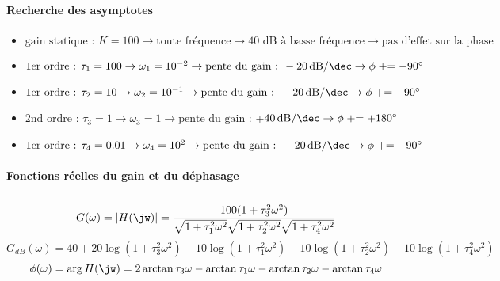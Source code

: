 \paragraph{Recherche des asymptotes}
\begin{itemize}
\item $\textrm{gain statique : } K=100      \rightarrow 
      \textrm{toute fréquence}           \rightarrow 
      \textrm{40 dB à basse fréquence}   \rightarrow 
      \textrm{pas d'effet sur la phase}$
\item $\textrm{1er ordre : }\tau_1=100     \rightarrow 
      \omega_1=10^{-2}                   \rightarrow 
      \textrm{pente du gain : } 
      \SI[per-mode=symbol]{-20}{\dB\per\dec} \rightarrow 
      \phi\mathrel{+}=-90\si{\degree}$ 
\item $ \textrm{1er ordre : }\tau_2=10     \rightarrow 
      \omega_2=10^{-1}                   \rightarrow 
      \textrm{pente du gain : } 
      \SI[per-mode=symbol]{-20}{\dB\per\dec} \rightarrow 
      \phi\mathrel{+}=-90\si{\degree}$ 
\item $ \textrm{2nd ordre : }\tau_3=1   \rightarrow 
      \omega_3=1                         \rightarrow 
      \textrm{pente du gain : } 
      $+$\SI[per-mode=symbol]{40}{\dB\per\dec}  \rightarrow 
      \phi\mathrel{+}=+180\si{\degree}$ 
\item $ \textrm{1er ordre : }\tau_4=0.01     \rightarrow 
      \omega_4=10^{2}                   \rightarrow 
      \textrm{pente du gain : } 
      \SI[per-mode=symbol]{-20}{\dB\per\dec} \rightarrow 
      \phi\mathrel{+}=-90\si{\degree}$ 
\end{itemize}
\begin{center}
    

    
\end{center}
\paragraph{Fonctions réelles du gain et du déphasage}$\,$\newline
\[
G(\omega)=|H(\jw)|=
\dfrac{100(1+\tau_3^2\omega^2)}
{\sqrt{1+\tau_1^2\omega^2}\sqrt{1+\tau_2^2\omega^2}\sqrt{1+\tau_4^2\omega^2}}
\]
\[
G_{dB}(\omega)=40+
               20\log{(1+\tau_3^2\omega^2)}
              -10\log{(1+\tau_1^2\omega^2)}
              -10\log{(1+\tau_2^2\omega^2)}
              -10\log{(1+\tau_4^2\omega^2)}
\]
\[
\phi(\omega)=\arg{H(\jw)}=
             2\arctan{\tau_3\omega}
             -\arctan{\tau_1\omega}
             -\arctan{\tau_2\omega}
             -\arctan{\tau_4\omega}
\]
